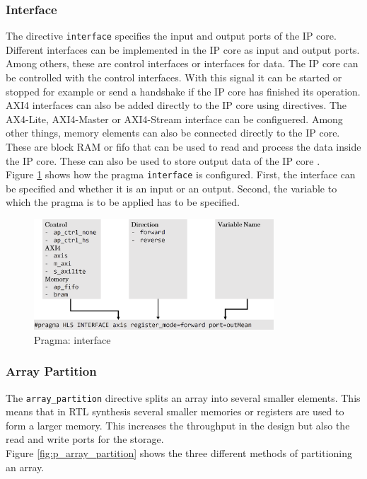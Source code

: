 \subsubsection*{Interface}
The directive \texttt{interface} specifies the input and output ports of the IP core. Different interfaces can be implemented in the IP core as input and output ports. Among others, these are control interfaces or interfaces for data. 
The IP core can be controlled with the control interfaces. With this signal it
can be started or stopped for example or send a handshake if the IP core has
finished its operation. 
AXI4 interfaces can also be added directly to the IP core using directives. The
AX4-Lite, AXI4-Master or AXI4-Stream interface can be configuered.
Among other things, memory elements can also be connected directly to the IP
core. These are block RAM or \gls{fifo} that can be used to read and process
the data
inside the IP core. These can also be used to store output data of the IP core 
\cite{pragma}. \\
Figure \ref{fig:p_interface} shows how the pragma \texttt{interface} is
configured. First, the interface can be specified and whether it is an input or
an output. Second, the variable to which the pragma is to be applied has to be
specified.

\begin{figure}[tb!]
    \centering
    \includegraphics[width=0.8\textwidth]{images/theory/interface.png}
    \caption{Pragma: interface}
    \label{fig:p_interface}
\end{figure}

\subsubsection*{Array Partition}
The \texttt{array\_partition} directive splits an array into several smaller
elements. This means that in RTL synthesis several smaller memories or registers
are used to form a larger memory. This increases the throughput in the
design but also the read and write ports for the storage. \\
Figure \ref{fig:p_array_partition} shows the three different methods of partitioning an array.

